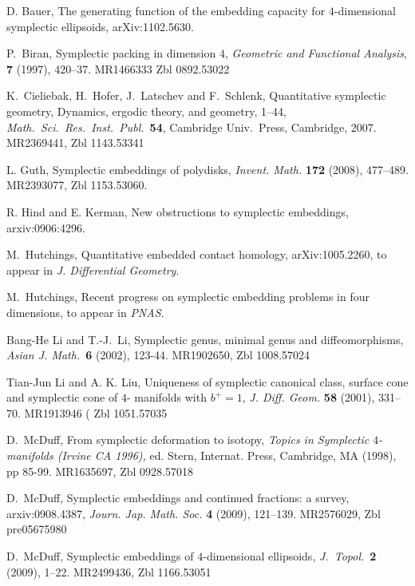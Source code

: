 \documentclass[11pt]{amsart}
\newcommand{\1}{{{\mathchoice {\rm 1\mskip-4mu l} {\rm 1\mskip-4mu l}
{\rm 1\mskip-4.5mu l} {\rm 1\mskip-5mu l}}}}
\numberwithin{figure}{section}
\numberwithin{equation}{section}
\begin{document}
\begin{thebibliography}{cccccc}

  D. Bauer, The generating function of the embedding
capacity for $4$-dimensional symplectic ellipsoids, arXiv:1102.5630.

 P.~Biran,
Symplectic packing in dimension $4$,
{\it Geometric  and Functional Analysis\/}, {\bf 7} 
(1997), 420--37. MR1466333
Zbl 0892.53022 

K.~Cieliebak, H.~Hofer, J.~Latschev and F.~Schlenk,
Quantitative symplectic geometry,
Dynamics, ergodic theory, and geometry,  1--44,
{\it Math.\ Sci.\ Res.\ Inst.\ Publ.}~{\bf 54},
Cambridge Univ.\ Press, Cambridge, 2007. MR2369441,
Zbl 1143.53341

  L. Guth, Symplectic embeddings of polydisks, 
      {\it Invent. Math.} {\bf 172} (2008), 477--489.
      MR2393077, 
Zbl 1153.53060.


  R. Hind and E. Kerman, New obstructions to symplectic embeddings, arxiv:0906:4296.

M.~Hutchings, Quantitative embedded contact homology,
arXiv:1005.2260, to appear in {\it J. Differential Geometry}.

M.~Hutchings, Recent progress on symplectic embedding problems in four dimensions, to appear in {\it PNAS}.

 Bang-He Li and T.-J.~Li, 
Symplectic genus, minimal genus and diffeomorphisms, 
{\it Asian J. Math.}~{\bf 6} (2002), 123-44. MR1902650, 
Zbl 1008.57024 


 Tian-Jun Li and A. K. Liu, Uniqueness of symplectic
     canonical class, surface cone and symplectic cone of $4$-   
     manifolds with $b^+=1$, {\it J. Diff. Geom.} {\bf 58} (2001),    
       331--70. MR1913946 (
Zbl 1051.57035 
       
D.~McDuff,  
From symplectic deformation to isotopy, 
{\it Topics in Symplectic $4$-manifolds (Irvine CA 1996),} ed.    
     Stern, Internat. Press, Cambridge, MA (1998), pp 85-99. MR1635697,
Zbl 0928.57018 

D.~McDuff,  
Symplectic embeddings and continued fractions: a survey, 
arxiv:0908.4387, {\it  Journ. Jap. Math. Soc.} {\bf 4}  (2009), 121--139.
MR2576029,
Zbl pre05675980 

%
D.~McDuff,
Symplectic embeddings of $4$-dimensional ellipsoids,
{\it J.~Topol.}~{\bf 2} (2009), 1--22.
MR2499436, 
Zbl 1166.53051 


\end{thebibliography}
\end{document}
